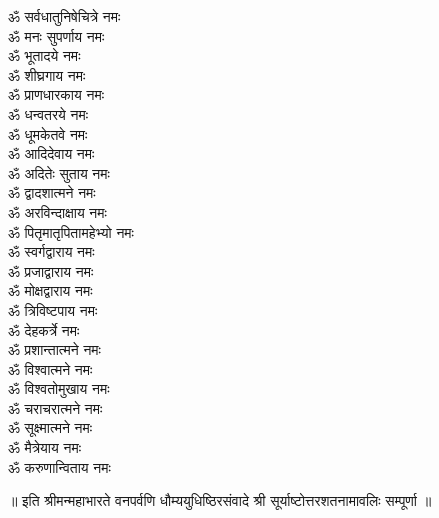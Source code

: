 \begin{multicols}{2}
\begin{flushleft}
ॐ सर्वधातुनिषेचित्रे नमः\\
ॐ मनः सुपर्णाय नमः\\
ॐ भूतादये नमः\\
ॐ शीघ्रगाय नमः\hfill{}\\
ॐ प्राणधारकाय नमः\\
ॐ धन्वतरये नमः\\
ॐ धूमकेतवे नमः\\
ॐ आदिदेवाय नमः\\
ॐ अदितेः सुताय नमः\\
ॐ द्वादशात्मने नमः\\
ॐ अरविन्दाक्षाय नमः\\
ॐ पितृमातृपितामहेभ्यो नमः\\
ॐ स्वर्गद्वाराय नमः\\
ॐ प्रजाद्वाराय नमः\hfill{}\\
ॐ मोक्षद्वाराय नमः\\
ॐ त्रिविष्टपाय नमः\\
ॐ देहकर्त्रे नमः\\
ॐ प्रशान्तात्मने नमः\\
ॐ विश्वात्मने नमः\\
ॐ विश्वतोमुखाय नमः\\
ॐ चराचरात्मने नमः\\
ॐ सूक्ष्मात्मने नमः\\
ॐ मैत्रेयाय नमः\\
ॐ करुणान्विताय नमः\hfill{}\\
\end{flushleft}
\end{multicols}
\centerline{॥ इति श्रीमन्महाभारते वनपर्वणि धौम्ययुधिष्ठिरसंवादे श्री सूर्याष्टोत्तरशतनामावलिः सम्पूर्णा ॥}
